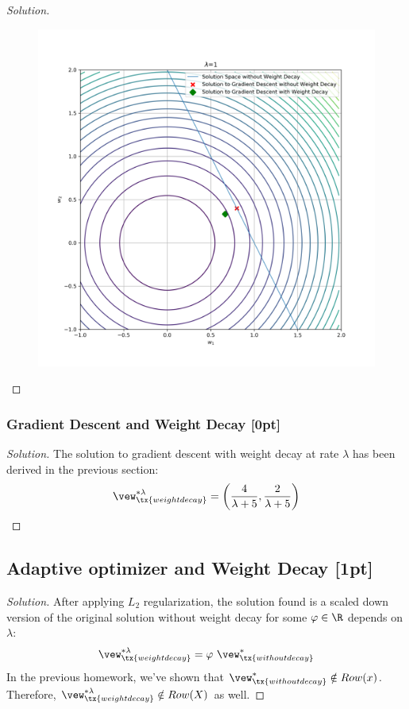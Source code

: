 \documentclass{article}
\begin{document}
\begin{proof}[Solution]
\begin{figure}[H]
			\includegraphics[width=\linewidth]{plot_q1.png}
		\end{figure}
	\end{proof}
	
	\subsubsection{Gradient Descent and Weight Decay [0pt]}
	\begin{proof}[Solution]
		The solution to gradient descent with weight decay at rate $\lambda$ has been derived in the previous section:
		\begin{align}
			\vew^{*\lambda}_\tx{weight decay} = \left(\frac{4}{\lambda +5}, \frac{2}{\lambda +5}\right)
		\end{align}
	\end{proof}
	
	\subsection{Adaptive optimizer and Weight Decay [1pt]}
	\begin{proof}[Solution]
		After applying $L_2$ regularization, the solution found is a scaled down version of the original solution without weight decay for some $\varphi \in \R$ depends on $\lambda$:
		\begin{align}
			\vew^{*\lambda}_\tx{weight decay} = \varphi \ \vew^{*}_\tx{without decay}
		\end{align}
		In the previous homework, we've shown that $\vew^{*}_\tx{without decay} \notin Row(x)$. Therefore, $\vew^{*\lambda}_\tx{weight decay} \notin Row(X)$ as well.
	\end{proof}
	
\end{document}
